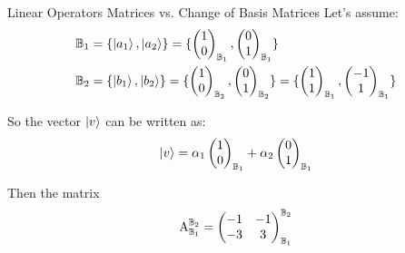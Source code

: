 \begin{example}{Linear Operators Matrices vs. Change of Basis Matrices}
	Let's assume:
	\begin{align*}
		\mathbb{B}_1 &= \{ \ket{a_1}, \ket{a_2} \} = \{ 
		\begin{pmatrix}
			1 \\
			0
		\end{pmatrix}_{\mathbb{B}_1},
		\begin{pmatrix}
			0 \\
			1
		\end{pmatrix}_{\mathbb{B}_1}
		\} \\
		\mathbb{B}_2 &= \{ \ket{b_1}, \ket{b_2} \} = \{ 
		\begin{pmatrix}
			1 \\
			0
		\end{pmatrix}_{\mathbb{B}_2},
		\begin{pmatrix}
			0 \\
			1
		\end{pmatrix}_{\mathbb{B}_2}
		\} = 
		\{ 
		\begin{pmatrix}
			1 \\
			1
		\end{pmatrix}_{\mathbb{B}_1},
		\begin{pmatrix}
			-1 \\
			1
		\end{pmatrix}_{\mathbb{B}_1}
		\}
	\end{align*}
	
	So the vector $ \ket{v} $ can be written as:
	\[ \ket{v} = 
		\alpha_1 \begin{pmatrix}
			1	\\
			0
		\end{pmatrix}_{\mathbb{B}_1} + 
		\alpha_2 \begin{pmatrix}
			0	\\
			1
		\end{pmatrix}_{\mathbb{B}_1}
	 \]
	
	Then the matrix
	\[ \operatorname{A}_{\mathbb{B}_1}^{\mathbb{B}_2} = \begin{pmatrix}
		-1	&	-1	\\
		-3	&	3	
	\end{pmatrix}_{\mathbb{B}_1}^{\mathbb{B}_2} \]


\end{example}
